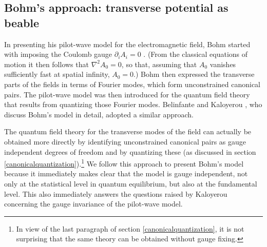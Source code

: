 \documentclass[12pt]{article}
\begin{document}
\subsection{Bohm's approach: transverse potential as beable}
In presenting his pilot-wave model for the electromagnetic field, Bohm started with imposing the Coulomb gauge $\partial_i A_i=0$ \cite{bohm52b}. (From the classical equations of motion it then follows that $\nabla^2 A_0 = 0$, so that, assuming that $A_0$ vanishes sufficiently fast at spatial infinity, $A_0=0$.) Bohm then expressed the transverse parts of the fields in terms of Fourier modes, which form unconstrained canonical pairs. The pilot-wave model was then introduced for the quantum field theory that results from quantizing those Fourier modes. Belinfante \cite[pp.\ 198-209]{belinfante73} and Kaloyerou \cite{kaloyerou85,kaloyerou94,kaloyerou96}, who discuss Bohm's model in detail, adopted a similar approach. 

The quantum field theory for the transverse modes of the field can actually be obtained more directly by identifying unconstrained canonical pairs as gauge independent degrees of freedom and by quantizing these (as discussed in section \ref{canonicalquantization}).{\footnote{In view of the last paragraph of section \ref{canonicalquantization}, it is not surprising that the same theory can be obtained without gauge fixing.}} We follow this approach to present Bohm's model because it immediately makes clear that the model is gauge independent, not only at the statistical level in quantum equilibrium, but also at the fundamental level. This also immediately answers the questions raised by Kaloyerou \cite{kaloyerou94,kaloyerou96} concerning the gauge invariance of the pilot-wave model. 
\end{document}

